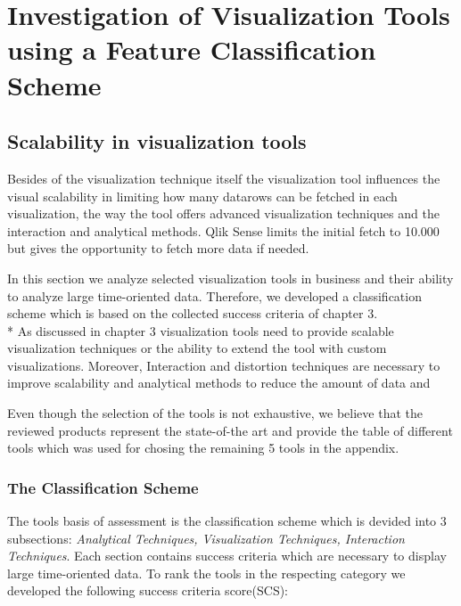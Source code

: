 \chapter{Investigation of Visualization Tools using a Feature Classification Scheme}
\label{chap:Tools}

\section{Scalability in visualization tools}
Besides of the visualization technique itself the visualization tool influences the visual scalability in limiting how many datarows can be fetched in each visualization, the way the tool offers advanced visualization techniques and the interaction and analytical methods. Qlik Sense limits the initial fetch to 10.000 but gives the opportunity to fetch more data if needed. 

In this section we analyze selected visualization tools in business and their ability to analyze large time-oriented data. Therefore, we developed a classification scheme which is based on the collected success criteria of chapter 3. \\*
As discussed in chapter 3 visualization tools need to provide scalable visualization techniques or the ability to extend the tool with custom visualizations. Moreover, Interaction and distortion techniques are necessary to improve scalability and analytical methods to reduce the amount of data and 


Even though the selection of the tools is not exhaustive, we believe that the reviewed products represent the state-of-the art and provide the table of different tools which was used for chosing the remaining 5 tools in the appendix.
\subsection{The Classification Scheme}
The tools basis of assessment is the classification scheme which is devided into 3  subsections: \textit{Analytical Techniques, Visualization Techniques, Interaction Techniques}. 
Each section contains success criteria which are necessary to display large time-oriented data. To rank the tools in the respecting category we developed the following success criteria score(SCS):

